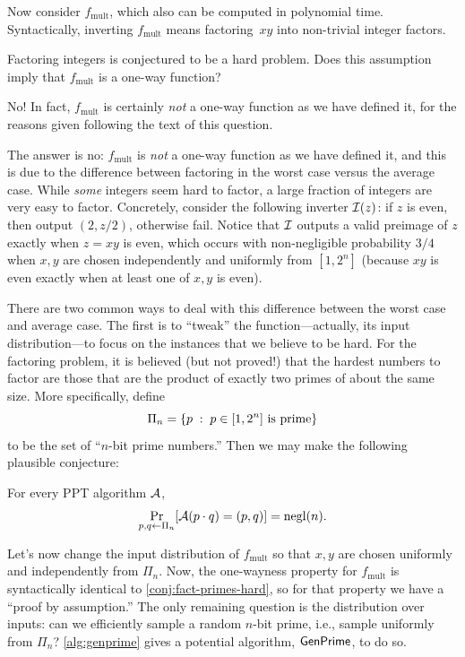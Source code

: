 \documentclass[11pt]{article}
\begin{document}
Now consider $f_{\text{mult}}$, which also can be computed in
polynomial time. Syntactically, inverting $f_{\text{mult}}$ means
factoring~$xy$ into non-trivial integer factors.

\begin{question}
  Factoring integers is conjectured to be a hard problem. Does this
  assumption imply that \(f_{\text{mult}}\) is a one-way function?
\end{question}

\begin{answer}
  No! In fact, \(f_{\text{mult}}\) is certainly \emph{not} a one-way
  function as we have defined it, for the reasons given following the
  text of this question.
\end{answer}

The answer is no: \(f_{\text{mult}}\) is \emph{not} a one-way function
as we have defined it, and this is due to the difference between
factoring in the worst case versus the average case. While \emph{some}
integers seem hard to factor, a large fraction of integers are very
easy to factor. Concretely, consider the following inverter $\mathcal{I}(z)$:
if $z$ is even, then output $(2, z/2)$, otherwise fail.  Notice that
$\mathcal{I}$ outputs a valid preimage of $z$ exactly when $z = xy$ is even,
which occurs with non-negligible probability $3/4$ when $x, y$ are
chosen independently and uniformly from $[1,2^{n}]$ (because $xy$ is
even exactly when at least one of $x,y$ is even).

There are two common ways to deal with this difference between the
worst case and average case.  The first is to ``tweak'' the
function---actually, its input distribution---to focus on the
instances that we believe to be hard.  For the factoring problem, it
is believed (but not proved!) that the hardest numbers to factor are
those that are the product of exactly two primes of about the same
size.  More specifically, define
\[ \Pi_{n} = \{ p\; :\; p \in [1,2^{n}] \text{ is prime}\} \] to be
the set of ``$n$-bit prime numbers.''  Then we may make the following
plausible conjecture:

\begin{conjecture}
  \label{conj:fact-primes-hard}
  For every PPT algorithm $\mathcal{A}$,
  \[ \Pr_{p,q \gets \Pi_{n}} [\mathcal{A}(p \cdot q) = (p,q)] = \operatorname{negl}(n). \]
\end{conjecture}

Let's now change the input distribution of $f_{\text{mult}}$ so that
$x,y$ are chosen uniformly and independently from $\Pi_{n}$.  Now, the
one-wayness property for $f_{\text{mult}}$ is syntactically identical
to \cref{conj:fact-primes-hard}, so for that property we
have a ``proof by assumption.''  The only remaining question is the
distribution over inputs: can we efficiently sample a random $n$-bit
prime, i.e., sample uniformly from $\Pi_{n}$?
\cref{alg:genprime} gives a potential algorithm,
$\mathsf{GenPrime}$, to do so.
\end{document}

